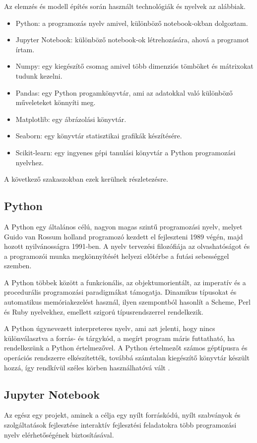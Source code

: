 Az elemzés és modell építés során használt technológiák és nyelvek az alábbiak.
\begin{itemize}
\item Python: a programozás nyelv amivel, különböző notebook-okban dolgoztam.
\item Jupyter Notebook: különböző notebook-ok létrehozására, ahová a programot írtam.
\item Numpy: egy kiegészítő csomag amivel több dimenziós tömböket és mátrixokat tudunk kezelni.
\item Pandas:  egy Python progamkönyvtár, ami az adatokkal való különböző műveleteket könnyíti meg.
\item Matplotlib: egy ábrázolási könyvtár.
\item Seaborn: egy könyvtár statisztikai grafikák készítésére.
\item Scikit-learn: egy ingyenes gépi tanulási könyvtár a Python programozási nyelvhez.
\end{itemize}

A következő szakaszokban ezek kerülnek részletezésre.

\subsection{Python}
A Python egy általános célú, nagyon magas szintű programozási nyelv, melyet Guido van Rossum holland programozó kezdett el fejleszteni 1989 végén, majd hozott nyilvánosságra 1991-ben. A nyelv tervezési filozófiája az olvashatóságot és a programozói munka megkönnyítését helyezi előtérbe a futási sebességgel szemben.

A Python többek között a funkcionális, az objektumorientált, az imperatív és a procedurális programozási paradigmákat támogatja. Dinamikus típusokat és automatikus memóriakezelést használ, ilyen szempontból hasonlít a Scheme, Perl és Ruby nyelvekhez, emellett szigorú típusrendszerrel rendelkezik.

A Python úgynevezett interpreteres nyelv, ami azt jelenti, hogy nincs különválasztva a forrás- és tárgykód, a megírt program máris futtatható, ha rendelkezünk a Python értelmezővel. A Python értelmezőt számos géptípusra és operációs rendszerre elkészítették, továbbá számtalan kiegészítő könyvtár készült hozzá, így rendkívül széles körben használhatóvá vált \cite{python}.

\subsection{Jupyter Notebook}
Az egész egy projekt, aminek a célja egy nyílt forráskódú, nyílt szabványok és szolgáltatások fejlesztése interaktív fejlesztési feladatokra több programozási nyelv elérhetőségének biztosításával.


